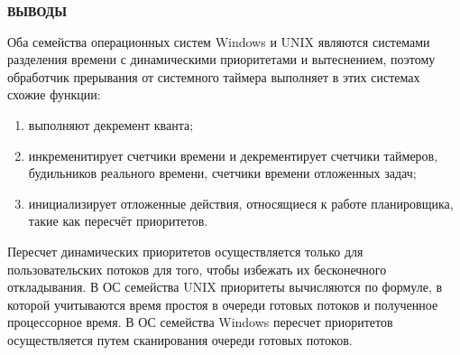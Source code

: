 \begin{center}
    \textbf{ВЫВОДЫ}
\end{center}

Оба семейства операционных систем Windows и UNIX являются системами разделения времени с динамическими приоритетами и вытеснением, поэтому обработчик прерывания от системного таймера выполняет в этих системах схожие функции:

\begin{enumerate} 
	\item выполняют декремент кванта;
	\item инкременитирует счетчики времени и декрементирует счетчики таймеров, будильников реального времени, счетчики времени отложенных задач;
	\item инициализирует отложенные действия, относящиеся к работе планировщика, такие как пересчёт приоритетов.

\end{enumerate} 

Пересчет динамических приоритетов осуществляется только для пользовательских потоков для того, чтобы избежать их бесконечного откладывания. В ОС семейства UNIX приоритеты вычисляются по формуле, в которой учитываются время простоя в очереди готовых потоков и полученное процессорное время. В ОС семейства Windows пересчет приоритетов осуществляется путем сканирования очереди готовых потоков.
